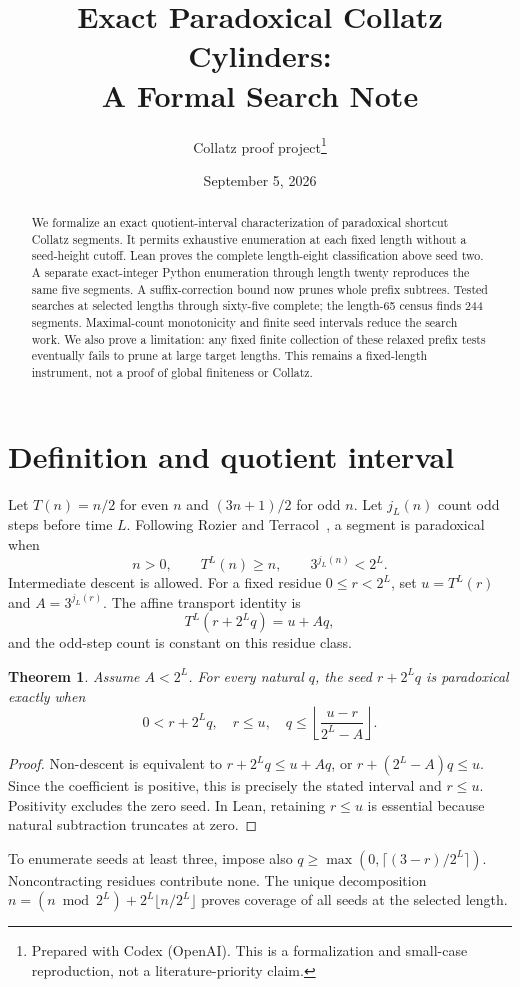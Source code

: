 \documentclass[11pt]{article}
\title{Exact Paradoxical Collatz Cylinders:\\A Formal Search Note}
\author{Collatz proof project\thanks{Prepared with Codex (OpenAI). This is a formalization and small-case reproduction, not a literature-priority claim.}}
\date{September 5, 2026}
\newtheorem{theorem}{Theorem}
\begin{document}
\maketitle
\begin{abstract}
We formalize an exact quotient-interval characterization of paradoxical shortcut Collatz segments. It permits exhaustive enumeration at each fixed length without a seed-height cutoff. Lean proves the complete length-eight classification above seed two. A separate exact-integer Python enumeration through length twenty reproduces the same five segments. A suffix-correction bound now prunes whole prefix subtrees. Tested searches at selected lengths through sixty-five complete; the length-65 census finds 244 segments. Maximal-count monotonicity and finite seed intervals reduce the search work. We also prove a limitation: any fixed finite collection of these relaxed prefix tests eventually fails to prune at large target lengths. This remains a fixed-length instrument, not a proof of global finiteness or Collatz.
\end{abstract}
\section{Definition and quotient interval}
Let $T(n)=n/2$ for even $n$ and $(3n+1)/2$ for odd $n$. Let $j_L(n)$ count odd steps before time $L$. Following Rozier and Terracol~\cite{RT}, a segment is paradoxical when
\[
n>0,\qquad T^L(n)\ge n,\qquad 3^{j_L(n)}<2^L.
\]
Intermediate descent is allowed. For a fixed residue $0\le r<2^L$, set $u=T^L(r)$ and $A=3^{j_L(r)}$. The affine transport identity is
\[
T^L(r+2^Lq)=u+Aq,
\]
and the odd-step count is constant on this residue class.
\begin{theorem}
Assume $A<2^L$. For every natural $q$, the seed $r+2^Lq$ is paradoxical exactly when
\[
0<r+2^Lq,\quad r\le u,\quad
q\le\left\lfloor\frac{u-r}{2^L-A}\right\rfloor.
\]
\end{theorem}
\begin{proof}
Non-descent is equivalent to $r+2^Lq\le u+Aq$, or $r+(2^L-A)q\le u$. Since the coefficient is positive, this is precisely the stated interval and $r\le u$. Positivity excludes the zero seed. In Lean, retaining $r\le u$ is essential because natural subtraction truncates at zero.
\end{proof}
To enumerate seeds at least three, impose also
$q\ge\max(0,\lceil(3-r)/2^L\rceil)$. Noncontracting residues contribute none. The unique decomposition $n=(n\bmod2^L)+2^L\lfloor n/2^L\rfloor$ proves coverage of all seeds at the selected length.
\end{document}
